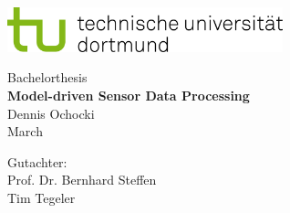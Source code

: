 \begin{titlepage}
\vspace*{-2cm}
\newlength{\links}
\setlength{\links}{-1.5cm}
\sffamily
\hspace*{\links}
\begin{minipage}{12.5cm}
\includegraphics[width=8cm]{bilder/tud_logo_rgb}
\end{minipage}

\vspace*{4cm}

\hspace*{\links}
\hspace*{-0.2cm}
\begin{minipage}{9cm}
\large
\begin{center}
{\Large Bachelorthesis} \\
\vspace*{1cm}
\textbf{Model-driven Sensor Data Processing} \\
\vspace*{1cm}
Dennis Ochocki\\
March
\end{center}
\end{minipage}
\normalsize
\vspace*{5.5cm}


\vspace*{2.1cm}

\hspace*{\links}
\begin{minipage}[b]{5cm}
\raggedright
Gutachter: \\
Prof. Dr. Bernhard Steffen \\
Tim Tegeler \\
\end{minipage}


\end{titlepage}
